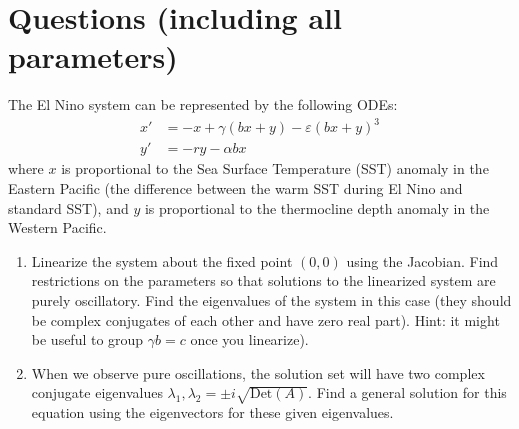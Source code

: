 \documentclass[10pt, letterpaper, answer]{exam}
\begin{document}

\section{Questions (including all parameters)}
The El Nino system can be represented by the following ODEs:
\begin{align}
    x' & = -x + \gamma (bx + y) - \varepsilon (bx + y)^3 \\
    y' & = -ry - \alpha  b x
\end{align}
where $x$ is proportional to the Sea Surface Temperature (SST) anomaly in the Eastern Pacific (the difference between the warm SST during El Nino and standard SST), and $y$ is  proportional to the thermocline depth anomaly in the Western Pacific.
\begin{enumerate}
    \item Linearize the system about the fixed point $(0,0)$ using the Jacobian. Find restrictions on the parameters so that solutions to the linearized system are purely oscillatory. Find the eigenvalues of the system in this case (they should be complex conjugates of each other and have zero real part). Hint: it might be useful to group $\gamma b = c$ once you linearize).

    \item When we observe pure oscillations, the solution set will have two complex conjugate eigenvalues $\lambda_1, \lambda_2 = \pm i\sqrt{\mathrm{Det}(A)}$. Find a general solution for this equation using the eigenvectors for these given eigenvalues. 


\end{enumerate}
\newpage
\end{document}

